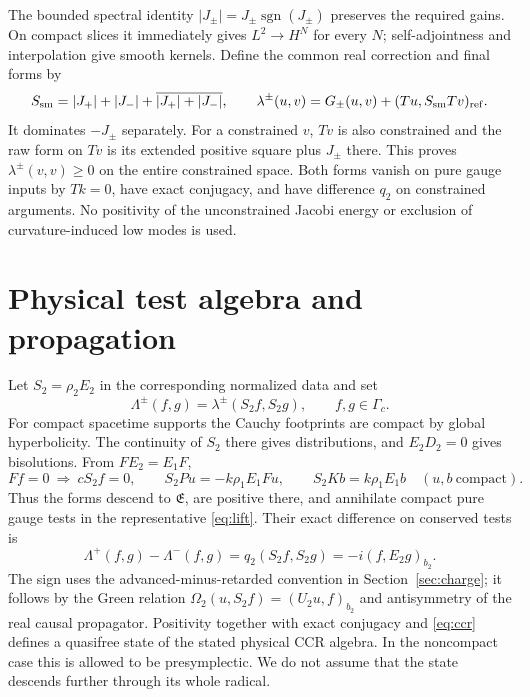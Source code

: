 \documentclass[11pt]{article}
\newcommand{\sgn}{\operatorname{sgn}}
\begin{document}
The bounded spectral identity \(\lvert J_\pm\rvert=J_\pm\sgn(J_\pm)\) preserves the required gains. On compact slices it immediately gives \(L^2\to H^N\) for every \(N\); self-adjointness and interpolation give smooth kernels. Define the common real correction and final forms by
\begin{equation}
 S_{\rm sm}=|J_+|+|J_-|+\overline{|J_+|+|J_-|},\qquad
 \lambda^\pm(u,v)=G_\pm(u,v)+(Tu,S_{\rm sm}Tv)_{\rm ref}.
 \label{eq:repair}
\end{equation}
It dominates \(-J_\pm\) separately. For a constrained \(v\), \(Tv\) is also constrained and the raw form on \(Tv\) is its extended positive square plus \(J_\pm\) there. This proves \(\lambda^\pm(v,v)\geq 0\) on the entire constrained space. Both forms vanish on pure gauge inputs by \(Tk=0\), have exact conjugacy, and have difference \(q_2\) on constrained arguments. No positivity of the unconstrained Jacobi energy or exclusion of curvature-induced low modes is used.



\section{Physical test algebra and propagation}\label{sec:lift}

Let \(S_2=\rho_2 E_2\) in the corresponding normalized data and set
\begin{equation}
 \Lambda^\pm(f,g)=\lambda^\pm(S_2 f,S_2g),\qquad f,g\in\Gamma_c .
 \label{eq:lift}
\end{equation}
For compact spacetime supports the Cauchy footprints are compact by global hyperbolicity. The continuity of \(S_2\) there gives distributions, and \(E_2D_2=0\) gives bisolutions. From \(FE_2=E_1F\),
\[
 Ff=0\ \Longrightarrow\ c S_2 f=0,\qquad
 S_2Pu=-k\rho_1 E_1Fu,\qquad S_2Kb=k\rho_1 E_1b
 \quad(u,b\ \text{compact}).
\]
Thus the forms descend to \(\mathfrak E\), are positive there, and annihilate compact pure gauge tests in the representative \eqref{eq:lift}. Their exact difference on conserved tests is
\begin{equation}
 \Lambda^+(f,g)-\Lambda^-(f,g)=q_2(S_2 f,S_2 g)
       =-i(f,E_2g)_{b_2}.
 \label{eq:ccr}
\end{equation}
The sign uses the advanced-minus-retarded convention in Section~\ref{sec:charge}; it follows by the Green relation \(\Omega_2(u,S_2 f)=(U_2u,f)_{b_2}\) and antisymmetry of the real causal propagator. Positivity together with exact conjugacy and \eqref{eq:ccr} defines a quasifree state of the stated physical CCR algebra. In the noncompact case this is allowed to be presymplectic. We do not assume that the state descends further through its whole radical.
\end{document}
